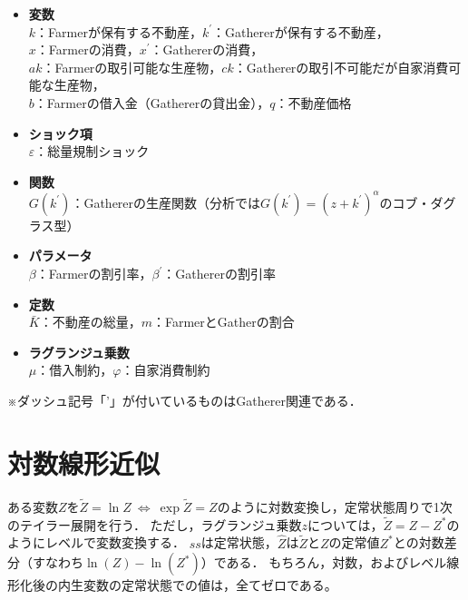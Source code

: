 \documentclass[dvipdfmx]{jlreq}
\begin{document}
\begin{itemize}
  \item \textbf{変数} \\
    $k$：Farmerが保有する不動産，$k^\prime$：Gathererが保有する不動産， \\
    $x$：Farmerの消費，$x^\prime$：Gathererの消費， \\
    $ak$：Farmerの取引可能な生産物，$ck$：Gathererの取引不可能だが自家消費可能な生産物， \\
    $b$：Farmerの借入金（Gathererの貸出金），$q$：不動産価格
  \item \textbf{ショック項} \\
    $\varepsilon$：総量規制ショック
  \item \textbf{関数} \\
    $G(k^\prime)$：Gathererの生産関数（分析では$G(k^\prime)=(z+k^\prime)^\alpha$のコブ・ダグラス型）
  \item \textbf{パラメータ} \\
    $\beta$：Farmerの割引率，$\beta^\prime$：Gathererの割引率
  \item \textbf{定数} \\
    $\bar{K}$：不動産の総量，$m$：FarmerとGatherの割合
  \item \textbf{ラグランジュ乗数} \\
    $\mu$：借入制約，$\varphi$：自家消費制約
\end{itemize}
※ダッシュ記号「'」が付いているものはGatherer関連である．


\section{対数線形近似}
ある変数$Z$を$\widetilde{Z} = \ln{Z} \ \Leftrightarrow \ \exp{\widetilde{Z}} = Z$のように対数変換し，定常状態周りで1次のテイラー展開を行う．
ただし，ラグランジュ乗数$z$については，$\widetilde{Z} = Z - Z^*$のようにレベルで変数変換する．
$ss$は定常状態，$\widehat{Z}$は$\widetilde{Z}$と$Z$の定常値$Z^*$との対数差分（すなわち$\ln(Z) - \ln(Z^*)$）である．
もちろん，対数，およびレベル線形化後の内生変数の定常状態での値は，全てゼロである。
\end{document}
